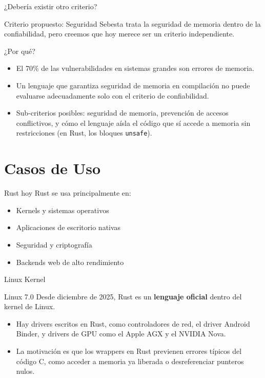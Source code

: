 \documentclass[11pt, aspectratio=169]{beamer}
\begin{document}
	\begin{frame}{¿Debería existir otro criterio?}
		\begin{block}{Criterio propuesto: Seguridad}
			Sebesta trata la seguridad de memoria dentro de la confiabilidad, pero creemos que hoy merece ser un criterio independiente.
		\end{block}
		
		\vspace{0.3cm}
		¿Por qué?
		\begin{itemize}
			\item El 70\% de las vulnerabilidades en sistemas grandes son errores de memoria.
			\item Un lenguaje que garantiza seguridad de memoria en compilación no puede evaluarse adecuadamente solo con el criterio de confiabilidad.
			\item Sub-criterios posibles: seguridad de memoria, prevención de accesos conflictivos, y cómo el lenguaje aísla el código que sí accede a memoria sin restricciones (en Rust, los bloques \texttt{unsafe}).
		\end{itemize}
	\end{frame}

	\section{Casos de Uso}

	\begin{frame}{Rust hoy}
		Rust se usa principalmente en:


			\begin{itemize}
				\item Kernels y sistemas operativos
				\item Aplicaciones de escritorio nativas



				\item Seguridad y criptografía
				\item Backends web de alto rendimiento
			\end{itemize}

	\end{frame}

	\begin{frame}{Linux Kernel}
		\begin{block}{Linux 7.0}
			Desde diciembre de 2025, Rust es un \textbf{lenguaje oficial} dentro del kernel de Linux.
		\end{block}
		
		\vspace{0.3cm}
		\begin{itemize}
			\item Hay drivers escritos en Rust, como controladores de red, el driver Android Binder, y drivers de GPU como el Apple AGX y el NVIDIA Nova.
			\item La motivación es que los wrappers en Rust previenen errores típicos del código C, como acceder a memoria ya liberada o desreferenciar punteros nulos.
		\end{itemize}
	\end{frame}
\end{document}
